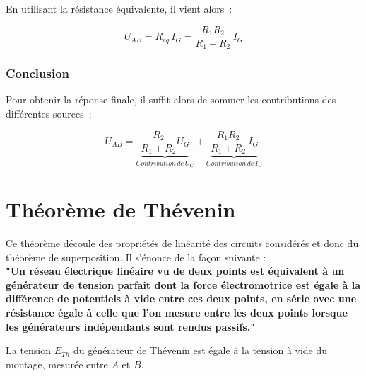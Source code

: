 En utilisant la résistance équivalente, il vient alors~:

$$ U_{AB} = R_{eq}\,I_G = \dfrac{R_1 R_2}{R_1 + R_2}\,I_G $$

\subsubsection*{Conclusion}

\begin{center}
	
\end{center}

Pour obtenir la réponse finale, il suffit alors de sommer les contributions des différentes sources~:

$$ U_{AB} = \underbrace{\dfrac{R_2}{R_1 + R_2} U_G}_{Contribution\,de\,U_G} + \underbrace{\dfrac{R_1 R_2}{R_1 + R_2}\,I_G}_{Contribution\,de\,I_G} $$

\pagebreak

\section{Théorème de Thévenin}

Ce théorème découle des propriétés de linéarité des circuits considérés et donc du théorème de superposition. Il s'énonce de la façon suivante : \\

\textbf{"Un réseau électrique linéaire vu de deux points est équivalent à un générateur de tension parfait dont la force électromotrice est égale à la différence de potentiels à vide entre ces deux points, en série avec une résistance égale à celle que l'on mesure entre les deux points lorsque les générateurs indépendants sont rendus passifs."}


\begin{center}
	
\end{center}

La tension $E_{Th}$ du générateur de Thévenin est égale à la tension à vide du montage, mesurée entre $A$ et $B$.





